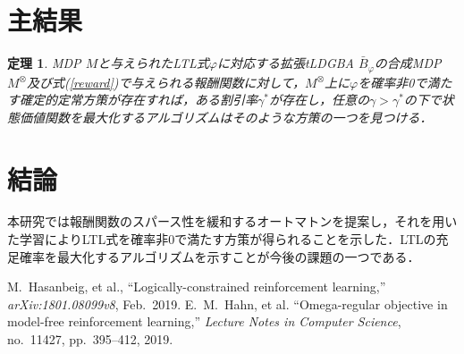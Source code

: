 \documentclass[a4j,9pt,twocolumn]{jsarticle}
\newtheorem{theorem}{定理}
\theoremstyle{definition}
\begin{document}
\section{主結果}
\begin{theorem}
  MDP $M$と与えられたLTL式$\varphi$に対応する拡張tLDGBA $\bar{B}_{\varphi}$の合成MDP $M^{\otimes}$及び式(\ref{reward})で与えられる報酬関数に対して，$M^{\otimes}$上に$\varphi$を確率非0で満たす確定的定常方策が存在すれば，ある割引率$\gamma^{\ast}$が存在し，任意の$\gamma>\gamma^{\ast}$の下で状態価値関数を最大化するアルゴリズムはそのような方策の一つを見つける．
\end{theorem}

\section{結論}
本研究では報酬関数のスパース性を緩和するオートマトンを提案し，それを用いた学習によりLTL式を確率非0で満たす方策が得られることを示した．LTLの充足確率を最大化するアルゴリズムを示すことが今後の課題の一つである．

\begin{thebibliography}{9}
  M.\ Hasanbeig, et al.,
  ``Logically-constrained reinforcement learning,'' \textit{arXiv:1801.08099v8}, Feb.\ 2019.
  E.\ M.\ Hahn, et al.
  ``Omega-regular objective in model-free reinforcement learning,''
  \textit{Lecture Notes in Computer Science}, no.\ 11427, pp.\ 395--412, 2019.
\end{thebibliography}
\newpage
\pagebreak
\end{document}
